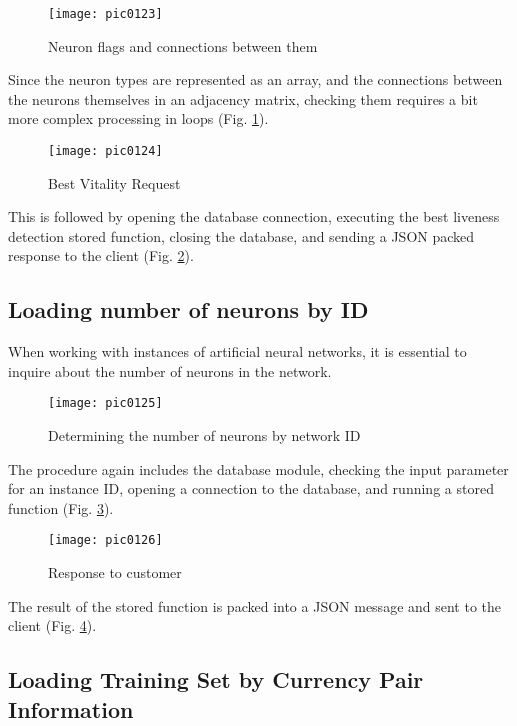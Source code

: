 \begin{figure}[h]
\centering
\texttt{[image: pic0123]}
\caption{Neuron flags and connections between them}
\label{fig:pic0123}
\end{figure}
\FloatBarrier

Since the neuron types are represented as an array, and the connections between the neurons themselves in an adjacency matrix, checking them requires a bit more complex processing in loops (Fig. \ref{fig:pic0123}).

\begin{figure}[h]
\centering
\texttt{[image: pic0124]}
\caption{Best Vitality Request}
\label{fig:pic0124}
\end{figure}
\FloatBarrier

This is followed by opening the database connection, executing the best liveness detection stored function, closing the database, and sending a JSON packed response to the client (Fig. \ref{fig:pic0124}).

\subsection{Loading number of neurons by ID}

When working with instances of artificial neural networks, it is essential to inquire about the number of neurons in the network.

\begin{figure}[h]
\centering
\texttt{[image: pic0125]}
\caption{Determining the number of neurons by network ID}
\label{fig:pic0125}
\end{figure}
\FloatBarrier

The procedure again includes the database module, checking the input parameter for an instance ID, opening a connection to the database, and running a stored function (Fig. \ref{fig:pic0125}).

\begin{figure}[h]
\centering
\texttt{[image: pic0126]}
\caption{Response to customer}
\label{fig:pic0126}
\end{figure}
\FloatBarrier

The result of the stored function is packed into a JSON message and sent to the client (Fig. \ref{fig:pic0126}).

\subsection{Loading Training Set by Currency Pair Information}

